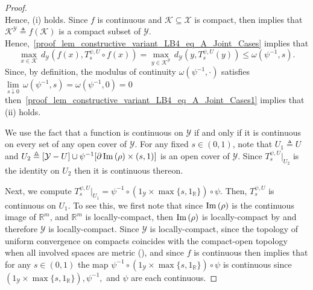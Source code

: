 \documentclass[anon,12pt]{colt2021} %
\newcommand{\rr}{{\mathbb{R}}}
\newcommand{\rrflex}[1]{{\ensuremath{\rr^{#1}
}}}
\newcommand{\rrm}{{\rrflex{m}}}
\newcommand{\xxx}{\mathcal{X}}
\newcommand{\yyy}{\mathcal{Y}}
\newcommand{\kkk}{{\mathscr{K}}}
\begin{document}
\begin{proof}
\begin{equation}
\end{equation}
Hence, (i) holds.  Since $f$ is continuous and $\kkk\subseteq \xxx$ is compact, then \citep[Theorem 26.5]{munkres2014topology} implies that $\kkk^{\yyy}\triangleq f(\kkk)$ is a compact subset of $\yyy$.  Hence,~\eqref{proof_lem_constructive_variant_LB4_eq_A_Joint_Cases} implies that
\begin{equation}
    \max_{x \in \kkk}\, d_{\yyy}\left(
    f(x)
        ,
    T_s^{\psi,U}\circ f(x)
    \right)
    =
    \max_{y \in \kkk^{\yyy}}\, d_{\yyy}\left(
    y
        ,
    T_s^{\psi,U}(y)
    \right)
    \leq  
    \omega\left(
    \psi^{-1}
    ,
    s
    \right)
    .
    \label{proof_lem_constructive_variant_LB4_eq_A_Joint_Cases1}
\end{equation}
Since, by definition, the modulus of continuity $\omega(\psi^{-1},\cdot)$ satisfies $\lim\limits_{s \downarrow 0}\, \omega(\psi^{-1},s)=\omega(\psi^{-1},0)=0$ then~\eqref{proof_lem_constructive_variant_LB4_eq_A_Joint_Cases1} implies that (ii) holds.  
 
We use the fact that a function is continuous on $\yyy$ if and only if it is continuous on every set of any open cover of $\yyy$.  For any fixed $s\in (0,1)$, note that $U_1\triangleq U$ and $U_2\triangleq [\yyy-U] \cup \psi^{-1}[\partial\im{\rho}\times (s,1)]$ is an open cover of $\yyy$.  Since $T_s^{\psi,U}|_{U_2}$ is the identity on $U_2$ then it is continuous thereon.

Next, we compute 
$T_s^{\psi,U}|_{U_1} = \psi^{-1} \circ (1_{\yyy}\times \max\{s,1_{\rr}\})\circ \psi$.  Then, $T_s^{\psi,U}$ is continuous on $U_1$.  To see this, we first note that since $\operatorname{Im}\left({\rho}\right)$ is the continuous image of $\rrm$, and $\rrm$ is locally-compact, then $\operatorname{Im}\left({\rho}\right)$ is locally-compact by \citep[Theorem 26.5]{munkres2014topology} and therefore $\yyy$ is locally-compact.  Since $\yyy$ is locally-compact, since the topology of uniform convergence on compacts coincides with the compact-open topology when all involved spaces are metric (\citep[Theorem 46.8]{munkres2014topology}), and since $f$ is continuous then \citep[Exercise 46.7]{munkres2014topology} implies that for any $s \in (0,1)$ the map $\psi^{-1} \circ (1_{\yyy}\times \max\{s,1_{\rr}\})\circ \psi$ is continuous since $(1_{\yyy}\times \max\{s,1_{\rr}\}), \psi^{-1},$ and $\psi$ are each continuous.  
\end{proof}
\end{document}
